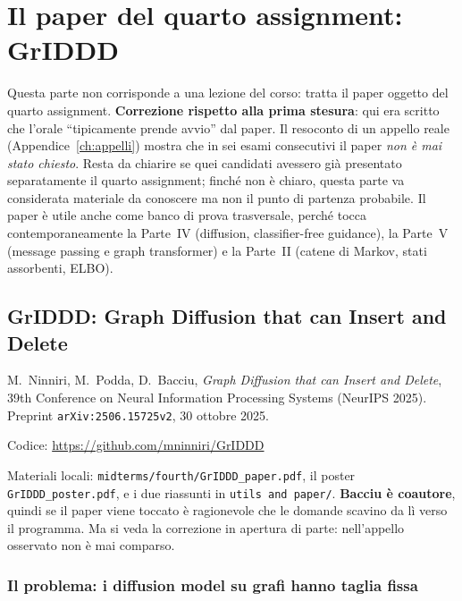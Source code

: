 \part{Il paper del quarto assignment: GrIDDD}
\label{part:griddd}

Questa parte non corrisponde a una lezione del corso: tratta il paper oggetto del quarto assignment. \textbf{Correzione rispetto alla prima stesura}: qui era scritto che l'orale ``tipicamente prende avvio'' dal paper. Il resoconto di un appello reale (Appendice~\ref{ch:appelli}) mostra che in sei esami consecutivi il paper \emph{non è mai stato chiesto}. Resta da chiarire se quei candidati avessero già presentato separatamente il quarto assignment; finché non è chiaro, questa parte va considerata materiale da conoscere ma non il punto di partenza probabile. Il paper è utile anche come banco di prova trasversale, perché tocca contemporaneamente la Parte~IV (diffusion, classifier-free guidance), la Parte~V (message passing e graph transformer) e la Parte~II (catene di Markov, stati assorbenti, ELBO).

\chapter{GrIDDD: Graph Diffusion that can Insert and Delete}
\label{ch:griddd}

\begin{tcolorbox}[mybox, title={Fonti}]
M.\ Ninniri, M.\ Podda, D.\ Bacciu, \emph{Graph Diffusion that can Insert and Delete}, 39th Conference on Neural Information Processing Systems (NeurIPS 2025). Preprint \texttt{arXiv:2506.15725v2}, 30 ottobre 2025.

\medskip
Codice: \url{https://github.com/mninniri/GrIDDD}

\medskip
Materiali locali: \texttt{midterms/fourth/GrIDDD\_paper.pdf}, il poster \texttt{GrIDDD\_poster.pdf}, e i due riassunti in \texttt{utils and paper/}. \textbf{Bacciu è coautore}, quindi se il paper viene toccato è ragionevole che le domande scavino da lì verso il programma. Ma si veda la correzione in apertura di parte: nell'appello osservato non è mai comparso.
\end{tcolorbox}

\section{Il problema: i diffusion model su grafi hanno taglia fissa}


